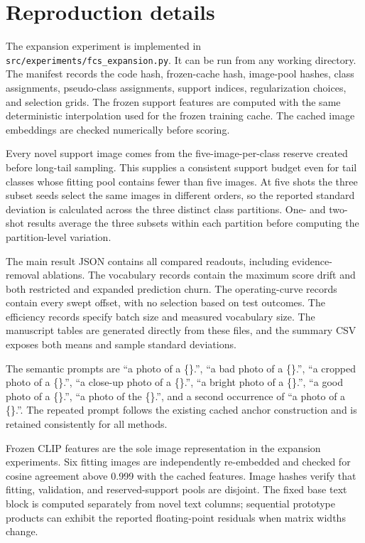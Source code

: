 \documentclass[preprint,review,12pt]{elsarticle}
\begin{document}
\section{Reproduction details}
\label{app:reproduction}
The expansion experiment is implemented in \nolinkurl{src/experiments/fcs_expansion.py}. It can be run from any working directory. The manifest records the code hash, frozen-cache hash, image-pool hashes, class assignments, pseudo-class assignments, support indices, regularization choices, and selection grids. The frozen support features are computed with the same deterministic interpolation used for the frozen training cache. The cached image embeddings are checked numerically before scoring.

Every novel support image comes from the five-image-per-class reserve created before long-tail sampling. This supplies a consistent support budget even for tail classes whose fitting pool contains fewer than five images. At five shots the three subset seeds select the same images in different orders, so the reported standard deviation is calculated across the three distinct class partitions. One- and two-shot results average the three subsets within each partition before computing the partition-level variation.

The main result JSON contains all compared readouts, including evidence-removal ablations. The vocabulary records contain the maximum score drift and both restricted and expanded prediction churn. The operating-curve records contain every swept offset, with no selection based on test outcomes. The efficiency records specify batch size and measured vocabulary size. The manuscript tables are generated directly from these files, and the summary CSV exposes both means and sample standard deviations.

The semantic prompts are ``a photo of a \{\}.'', ``a bad photo of a \{\}.'', ``a cropped photo of a \{\}.'', ``a close-up photo of a \{\}.'', ``a bright photo of a \{\}.'', ``a good photo of a \{\}.'', ``a photo of the \{\}.'', and a second occurrence of ``a photo of a \{\}.''. The repeated prompt follows the existing cached anchor construction and is retained consistently for all methods.

Frozen CLIP features are the sole image representation in the expansion experiments. Six fitting images are independently re-embedded and checked for cosine agreement above 0.999 with the cached features. Image hashes verify that fitting, validation, and reserved-support pools are disjoint. The fixed base text block is computed separately from novel text columns; sequential prototype products can exhibit the reported floating-point residuals when matrix widths change.
\end{document}
